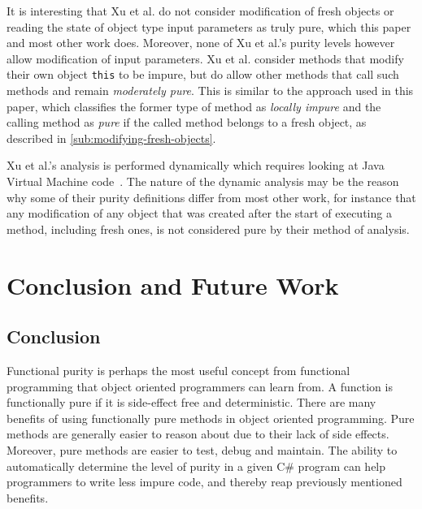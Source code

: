 \documentclass[a4paper,12pt]{article}
\begin{document}
It is interesting that Xu et al. do not consider modification of fresh objects or reading the state of object type input parameters as truly pure, which this paper and most other work does. Moreover, none of Xu et al.'s purity levels however allow modification of input parameters. Xu et al. consider methods that modify their own object \texttt{this} to be impure, but do allow other methods that call such methods and remain \textit{moderately pure}. This is similar to the approach used in this paper, which classifies the former type of method as \textit{locally impure} and the calling method as \textit{pure} if the called method belongs to a fresh object, as described in \autoref{sub:modifying-fresh-objects}.

Xu et al.'s analysis is performed dynamically which requires looking at Java Virtual Machine code~\cite{xu2007dynamic}. The nature of the dynamic analysis may be the reason why some of their purity definitions differ from most other work, for instance that any modification of any object that was created after the start of executing a method, including fresh ones, is not considered pure by their method of analysis.

\section{Conclusion and Future Work} \label{sec:Conclusion and future Work} %

\subsection{Conclusion} \label{sub:Conclusion}


Functional purity is perhaps the most useful concept from functional programming that object oriented programmers can learn from. A function is functionally pure if it is side-effect free and deterministic. There are many benefits of using functionally pure methods in object oriented programming. Pure methods are generally easier to reason about due to their lack of side effects. Moreover, pure methods are easier to test, debug and maintain. The ability to automatically determine the level of purity in a given C\# program can help programmers to write less impure code, and thereby reap previously mentioned benefits.
\end{document}
